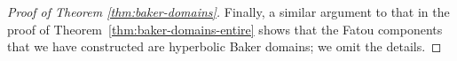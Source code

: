 \documentclass[a4paper, 12pt, reqno]{amsart}
\newcommand{\margin}[1]{\marginnote{\red{#1}}}
\numberwithin{equation}{section}
\newcommand{\red}[1]{{\color{red} #1}}
\newcommand{\ds}{\displaystyle}
\theoremstyle{plain}
\theoremstyle{definition}
\theoremstyle{remark}
\newcommand{\C}{{\mathbb{C}}}
\newcommand{\N}{{\mathbb{N}}}
\begin{document}
\begin{proof}[Proof of Theorem \ref{thm:baker-domains}]
%
%
%
%
%
%

Finally, a similar argument to that in the proof of Theorem~\ref{thm:baker-domains-entire} shows that the Fatou components that we have constructed are hyperbolic Baker domains; we omit the details.
\end{proof}
\end{document}
